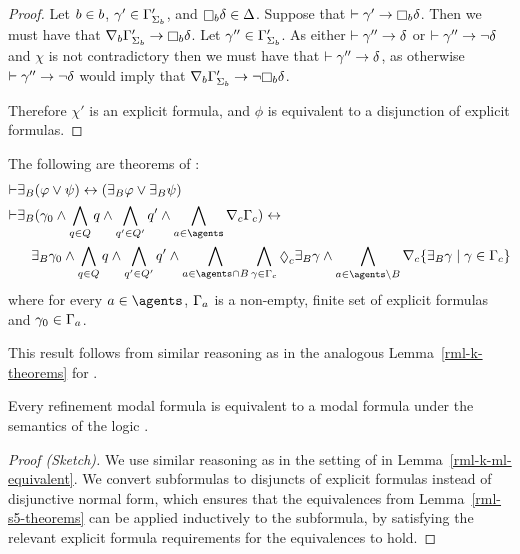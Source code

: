 \begin{proof}
Let $b \in b$, $\gamma' \in \Gamma'_{\Sigma_b}$, and $\necessaryB \delta \in \Delta$.
Suppose that $\proves \gamma' \implies \necessaryB \delta$.
Then we must have that $\coversB \Gamma'_{\Sigma_\agentB} \implies \necessaryB \delta$.
Let $\gamma'' \in \Gamma'_{\Sigma_b}$.
As either $\vdash \gamma'' \rightarrow \delta$ or $\vdash \gamma'' \rightarrow \neg \delta$ and $\chi$ is not contradictory then we must have that $\vdash \gamma'' \rightarrow \delta$, as otherwise $\vdash \gamma'' \rightarrow \neg \delta$ would imply that $\coversB \Gamma'_{\Sigma_\agentB} \implies \neg \necessaryB \delta$.

Therefore $\chi'$ is an explicit formula, and $\phi$ is equivalent to a disjunction of explicit formulas.
\end{proof}

\begin{lemma}\label{rml-s5-theorems}
The following are theorems of \axiomRmlS{}:
\begin{align}
    \proves & \somerefsBs (\phi \lor \psi) \iff (\somerefsBs \phi \lor \somerefsBs \psi)\\
    \proves & \displaystyle \somerefsBs (\gamma_0 \land \bigwedge_{\atomQ \in \atomsQ} \atomQ \land \bigwedge_{\atomQ' \in \atomsQ'} \atomQ' \land \bigwedge_{\agentA \in \agents} \coverC \Gamma_\agentC) \iff \nonumber\\
            & \displaystyle \quad
            \somerefsBs \gamma_0 \land
            \bigwedge_{\atomQ \in \atomsQ} \atomQ \land \bigwedge_{\atomQ' \in \atomsQ'} \atomQ' \land 
            \bigwedge_{\agentA \in \agents \cap \agentsB} \bigwedge_{\gamma \in \Gamma_\agentC} \possibleC \somerefsBs \gamma \land
            \bigwedge_{\agentA \in \agents \setminus \agentsB} \coversC \{\somerefsBs \gamma \mid \gamma \in \Gamma_\agentC\}
\end{align}
where for every $\agentA \in \agents$, $\Gamma_a$ is a non-empty, finite set of explicit formulas and $\gamma_0 \in \Gamma_a$.
\end{lemma}

This result follows from similar reasoning as in the analogous Lemma~\ref{rml-k-theorems} for \axiomRmlK{}.

\begin{lemma}\label{rml-s5-ml-equivalent}
Every refinement modal formula is equivalent to a modal formula under the semantics of the logic \logicRmlS{}.
\end{lemma}

\begin{proof}[Proof (Sketch)]
We use similar reasoning as in the setting of \logicRmlK{} in Lemma~\ref{rml-k-ml-equivalent}.
We convert subformulas to disjuncts of explicit formulas instead of disjunctive normal form, which ensures that the equivalences from Lemma~\ref{rml-s5-theorems} can be applied inductively to the subformula, by satisfying the relevant explicit formula requirements for the equivalences to hold.
\end{proof}

